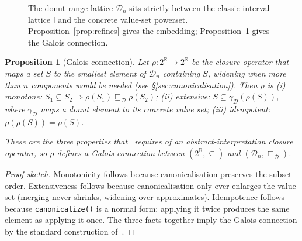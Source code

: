\documentclass[11pt,a4paper]{article}
\theoremstyle{plain}
\newtheorem{proposition}{Proposition}
\begin{document}
\begin{figure}[H]
\centering
{}
\caption{The donut-range lattice $\mathcal{D}_n$ sits strictly between
the classic interval lattice $\mathsf{I}$ and the concrete value-set
powerset. Proposition~\ref{prop:refines} gives the embedding;
Proposition~\ref{prop:galois} gives the Galois connection.}
\label{fig:lattice}
\end{figure}

\begin{proposition}[Galois connection]\label{prop:galois}
Let $\rho\colon 2^{\mathbb{R}}\to 2^{\mathbb{R}}$ be the closure
operator that maps a set $S$ to the smallest element of $\mathcal{D}_n$
containing $S$, widening when more than $n$ components would be needed
(see \S\ref{sec:canonicalisation}). Then $\rho$ is
\emph{(i) monotone}: $S_1\subseteq S_2 \Rightarrow \rho(S_1)\sqsubseteq_{\mathcal{D}}\rho(S_2)$;
\emph{(ii) extensive}: $S \subseteq \gamma_{\mathcal{D}}(\rho(S))$,
where $\gamma_{\mathcal{D}}$ maps a donut element to its concrete
value set;
\emph{(iii) idempotent}: $\rho(\rho(S)) = \rho(S)$.

These are the three properties that~\cite[\S3, p.~35]{history-ai}
requires of an abstract-interpretation closure operator, so $\rho$
defines a Galois connection between $(2^{\mathbb{R}},\subseteq)$ and
$(\mathcal{D}_n,\sqsubseteq_{\mathcal{D}})$.
\end{proposition}
\begin{proof}[Proof sketch]
Monotonicity follows because canonicalisation preserves the subset
order. Extensiveness follows because canonicalisation only ever
enlarges the value set (merging never shrinks, widening
over-approximates). Idempotence follows because
\texttt{canonicalize()} is a normal form: applying it twice produces
the same element as applying it once. The three facts together imply
the Galois connection by the standard construction
of~\cite[\S3]{history-ai}.
\end{proof}
\end{document}
